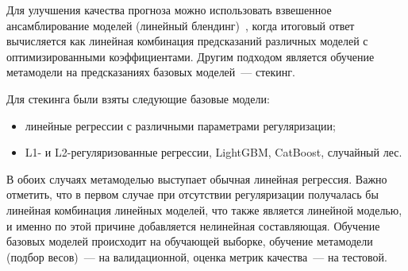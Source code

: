 Для улучшения качества прогноза можно использовать взвешенное ансамблирование моделей (линейный блендинг)~\cite{ZhangC}, когда итоговый ответ вычисляется как линейная комбинация предсказаний различных моделей с оптимизированными коэффициентами. Другим подходом является обучение метамодели на предсказаниях базовых моделей~--- стекинг.

Для стекинга были взяты следующие базовые модели:
\begin{itemize}[noitemsep, topsep=0pt, parsep=0pt, partopsep=0pt]
    \item линейные регрессии с различными параметрами регуляризации;
    \item L1- и L2-регуляризованные регрессии, LightGBM, CatBoost, случайный лес.
\end{itemize}
В обоих случаях метамоделью выступает обычная линейная регрессия. Важно отметить, что в первом случае при отсутствии регуляризации получалась бы линейная комбинация линейных моделей, что также является линейной моделью, и именно по этой причине добавляется нелинейная составляющая. Обучение базовых моделей происходит на обучающей выборке, обучение метамодели (подбор весов)~--- на валидационной, оценка метрик качества~--- на тестовой.

